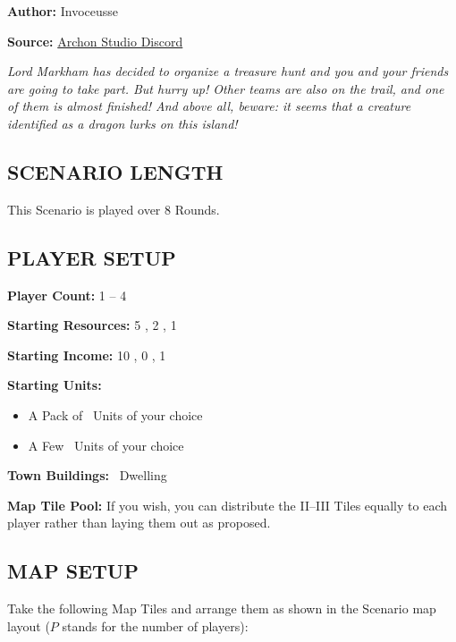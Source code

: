 
\begin{multicols}{2}

\textbf{Author:} Invoceusse

\textbf{Source:} \href{https://discord.com/channels/740870068178649108/1222679455261261986}{Archon Studio Discord}

\textit{Lord Markham has decided to organize a treasure hunt and you and your friends are going to take part.
  But hurry up! Other teams are also on the trail, and one of them is almost finished!
  And above all, beware: it seems that a creature identified as a dragon lurks on this island!}
\subsection*{\MakeUppercase{Scenario Length}}

This Scenario is played over 8 Rounds.

\subsection*{\MakeUppercase{Player Setup}}

\textbf{Player Count:} 1 -- 4

\textbf{Starting Resources:} 5 , 2 , 1 

\textbf{Starting Income:} 10 , 0 , 1 

\textbf{Starting Units:}
\begin{itemize}
  \item A Pack of \bronze\ Units of your choice
  \item A Few \bronze\ Units of your choice
\end{itemize}

\textbf{Town Buildings:} \bronze\ Dwelling

\textbf{Map Tile Pool:} If you wish, you can distribute the II--III Tiles equally to each player rather than laying them out as proposed.

\subsection*{\MakeUppercase{Map Setup}}

Take the following Map Tiles and arrange them as shown in the Scenario map layout ($P$ stands for the number of players):


\end{multicols}
